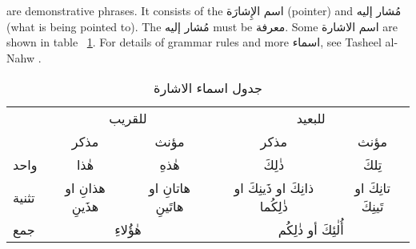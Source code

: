 \documentclass[../main.tex]{subfiles}
\begin{document}
\begin{english}
     are demonstrative phrases. It consists of the \textarabic{اسم الإِشارَة} (pointer) and \textarabic{مُشار إليه} (what is being pointed to). The \textarabic{مُشار إليه} must be \textarabic{معرفة}. Some \textarabic{اسم الاشارة} are shown in table \textarabic{~\ref{table:ishara}}. For details of grammar rules and more \textarabic{اسماء}, see Tasheel al-Nahw \autocite{tasheel}.
\end{english}

\begin{table}[H]
\centering
\begin{tabular}{lcccc}
                           & \multicolumn{2}{c}{للقريب}                                                    & \multicolumn{2}{c}{للبعيد}                                                                  \\
                           & مذكر                                 & مؤنث                                   & مذكر                                               & مؤنث                                   \\ \cline{2-5} 
\multicolumn{1}{l|}{واحد}  & \multicolumn{1}{c|}{هٰذا}            & \multicolumn{1}{c|}{هٰذهِ}             & \multicolumn{1}{c|}{ذٰلِكَ}                        & \multicolumn{1}{c|}{تِلكَ}             \\ \cline{2-5} 
\multicolumn{1}{l|}{تثنية} & \multicolumn{1}{c|}{هذانِ او هذَينِ} & \multicolumn{1}{c|}{هاتانِ او هاتَينِ} & \multicolumn{1}{c|}{ذانِكَ او ذَينِكَ او ذٰلِكُما} & \multicolumn{1}{c|}{تانِكَ او تَينِكَ} \\ \cline{2-5} 
\multicolumn{1}{l|}{جمع}   & \multicolumn{2}{c|}{هٰؤُلاءِ}                                                 & \multicolumn{2}{c|}{أُلٰئِكَ أو ذٰلِكُم}                                                    \\ \cline{2-5} 
\end{tabular}
\caption{جدول اسماء الاشارة}
\label{table:ishara}
\end{table}
\end{document}
